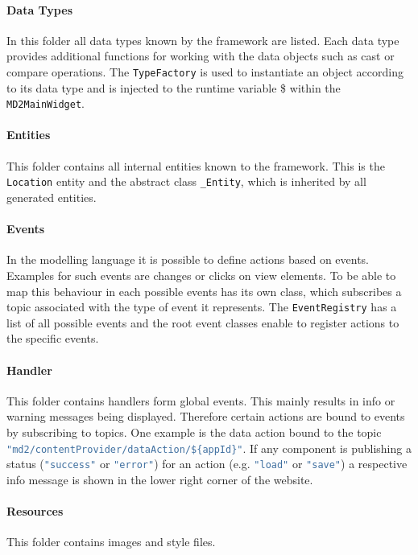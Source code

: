 \paragraph{Data Types}
In this folder all data types known by the \MD \mapapps framework are listed. Each data type provides additional functions for working with the data objects such as cast or compare operations. The \lstinline|TypeFactory| is used to instantiate an object according to its data type and is injected to the runtime variable \$ within the \lstinline|MD2MainWidget|.

\paragraph{Entities}
This folder contains all internal entities known to the \MD \mapapps framework. This is the \lstinline|Location| entity and the abstract class \lstinline|_Entity|, which is inherited by all generated entities.

\paragraph{Events}
In the \MD modelling language it is possible to define actions based on events. Examples for such events are changes or clicks on view elements. To be able to map this behaviour in \mapapps each possible events has its own class, which subscribes a topic associated with the type of event it represents. The \lstinline|EventRegistry| has a list of all possible events and the root event classes enable to register actions to the specific events.

\paragraph{Handler}
This folder contains handlers form global events. This mainly results in info or warning messages being displayed. Therefore certain actions are bound to events by subscribing to topics. One example is the data action bound to the topic \lstinline[language=Javascript]|"md2/contentProvider/dataAction/${appId}"|. If any component is publishing a status (\lstinline[language=Javascript]|"success"| or \lstinline[language=Javascript]|"error"|) for an action (e.g. \lstinline[language=Javascript]|"load"| or \lstinline[language=Javascript]|"save"|) a respective info message is shown in the lower right corner of the website.

\paragraph{Resources}
This folder contains images and style files.


